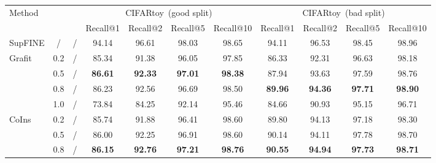 \documentclass[10pt,twocolumn,letterpaper]{article}
\begin{document}
\begin{table*}[htbp]
\centering
\begin{tabular}{@{}l|c|c|cccc|cccc@{}}
\toprule
\multirow{2}{*}{Method}  & \multirow{2}{*}{} & \multirow{2}{*}{} & \multicolumn{4}{c|}{CIFARtoy~(good split)}                        & \multicolumn{4}{c}{CIFARtoy~(bad split)}                          \\ \cmidrule(l){4-11} 
                         &                      &                         & Recall@1       & Recall@2       & Recall@5       & Recall@10      & Recall@1       & Recall@2       & Recall@5       & Recall@10      \\ \midrule
SupFINE                  & /                    & /                       & 94.14          & 96.61          & 98.03          & 98.65          & 94.11          & 96.53          & 98.45          & 98.96          \\ \midrule
\multirow{4}{*}{Grafit}  & 0.2                  & /                       & 85.34          & 91.38          & 96.05          & 97.85          & 86.33          & 92.31          & 96.63          & 98.18          \\
                         & 0.5                  & /                       & \textbf{86.61} & \textbf{92.33} & \textbf{97.01} & \textbf{98.38} & 87.94          & 93.63          & 97.59          & 98.76          \\
                         & 0.8                  & /                       & 86.23          & 92.56          & 96.69          & 98.50          & \textbf{89.96} & \textbf{94.36} & \textbf{97.71} & \textbf{98.90} \\
                         & 1.0                  & /                       & 73.84          & 84.25          & 92.14          & 95.46          & 84.66          & 90.93          & 95.15          & 96.71          \\ \midrule
\multirow{4}{*}{CoIns}   & 0.2                  & /                       & 85.74          & 91.88          & 96.41          & 98.60          & 89.80          & 94.13          & 97.18          & 98.30          \\
                         & 0.5                  & /                       & 86.00          & 92.25          & 96.91          & 98.60          & 90.14          & 94.11          & 97.78          & 98.70          \\
                         & 0.8                  & /                       & \textbf{86.15} & \textbf{92.76} & \textbf{97.21} & \textbf{98.76} & \textbf{90.55} & \textbf{94.94} & \textbf{97.73} & \textbf{98.71} \\

\end{tabular}
\end{table*}
\end{document}
